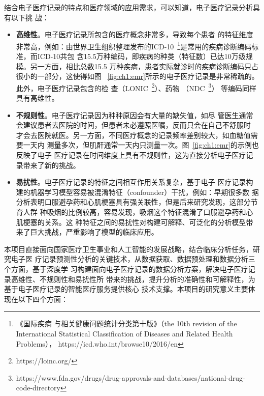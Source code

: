 结合电子医疗记录的特点和医疗领域的应用需求，可以知道，电子医疗记录分析具有以下挑
战：
\begin{itemize}

    \item[(1)] \textbf{高维性}。电子医疗记录所包含的医疗概念非常多，导致每个患者
    的特征维度非常高，例如：由世界卫生组织整理发布的ICD-10~\footnote{《国际疾病
    与相关健康问题统计分类第十版》（the 10th revision of the International
    Statistical Classification of Diseases and Related Health Problems），
    https://icd.who.int/browse10/2016/en}是常用的疾病诊断编码标准，而ICD-10共包
    含15.5万种编码，即疾病的种类（特征数）已达10万级规模。另一方面，相比总数15.5
    万种疾病，患者实际就诊时的疾病诊断编码只占很小的一部分，这使得如图
    ~\ref{fig:ch1:emr}所示的电子医疗记录是非常稀疏的。此外，电子医疗记录包含的检
    查（LONIC~\footnote{https://loinc.org/}）、药物
    （NDC~\footnote{https://www.fda.gov/drugs/drug-approvals-and-databases/national-drug-code-directory}）
    等编码同样具有高维性。

    \item[(2)] \textbf{不规则性}。电子医疗记录因为种种原因会有大量的缺失值，如尽
    管医生通常会建议患者去医院的时间，但患者未必遵照医嘱，反而只会在自己不舒服时
    才会去医院就医。另一方面，不同医疗概念的记录频率差别较大，如血糖值需要一天内
    测量多次，但肌酐通常一天内只测量一次。图~\ref{fig:ch1:emr}的示例也反映了电子
    医疗记录在时间维度上具有不规则性，这为直接分析电子医疗记录带来了新的挑战。

    \item[(3)] \textbf{易扰性}。电子医疗记录的特征之间相互作用关系复杂，基于电子
    医疗记录构建的机器学习模型容易被混淆特征（confounder）干扰，例如：早期很多数
    据分析表明口服避孕药和心肌梗塞具有强关联性，但是后来研究发现，这部分节育人群
    种吸烟的比例较高，容易发现，吸烟这个特征混淆了口服避孕药和心肌梗塞的关系。这
    种特征之间的易扰性对构建可解释、可泛化的分析模型带来了巨大挑战，严重影响了模型的临床应用。
\end{itemize}

本项目直接面向国家医疗卫生事业和人工智能的发展战略，结合临床分析任务，研究电子医
疗记录预测性分析的关键技术，从数据获取、数据预处理和数据分析三个方面，基于深度学
习构建面向电子医疗记录的数据分析方案，解决电子医疗记录高维性、不规则性和易扰性所
带来的挑战，提升分析的准确性和可解释性，为基于电子医疗记录的智能医疗服务提供核心
技术支撑。本项目的研究意义主要体现在以下四个方面：

